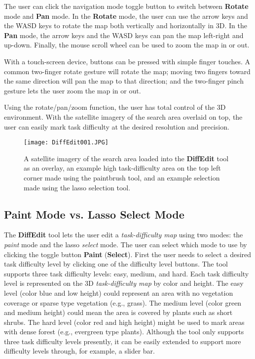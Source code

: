 The user can click the navigation mode toggle button to switch between \textbf{Rotate} mode and \textbf{Pan} mode. In the \textbf{Rotate} mode, the user can use the arrow keys and the WASD keys to rotate the map both vertically and horizontally in 3D. In the \textbf{Pan} mode, the arrow keys and the WASD keys can pan the map left-right and up-down. Finally, the mouse scroll wheel can be used to zoom the map in or out.

With a touch-screen device, buttons can be pressed with simple finger touches. A common two-finger rotate gesture will rotate the map; moving two fingers toward the same direction will pan the map to that direction; and the two-finger pinch gesture lets the user zoom the map in or out.

Using the rotate/pan/zoom function, the user has total control of the 3D environment. With the satellite imagery of the search area overlaid on top, the user can easily mark task difficulty at the desired resolution and precision.

\begin{figure}
\centering
\texttt{[image: DiffEdit001.JPG]}
\caption{A satellite imagery of the search area loaded into the \textbf{DiffEdit} tool as an overlay, an example high task-difficulty area on the top left corner made using the paintbrush tool, and an example selection made using the lasso selection tool.}
\label{DiffEdit001}
\end{figure}


\subsection{Paint Mode vs. Lasso Select Mode}

The \textbf{DiffEdit} tool lets the user edit a \textit{task-difficulty map} using two modes: the \textit{paint} mode and the lasso \textit{select} mode. The user can select which mode to use by clicking the toggle button \textbf{Paint} (\textbf{Select}). First the user needs to select a desired task difficulty level by clicking one of the difficulty level buttons. The tool supports three task difficulty levels: easy, medium, and hard. Each task difficulty level is represented on the 3D \textit{task-difficulty map} by color and height. The easy level (color blue and low height) could represent an area with no vegetation coverage or sparse type vegetation (e.g., grass). The medium level (color green and medium height) could mean the area is covered by plants such as short shrubs. The hard level (color red and high height) might be used to mark areas with dense forest (e.g., evergreen type plants). Although the tool only supports three task difficulty levels presently, it can be easily extended to support more difficulty levels through, for example, a slider bar.

